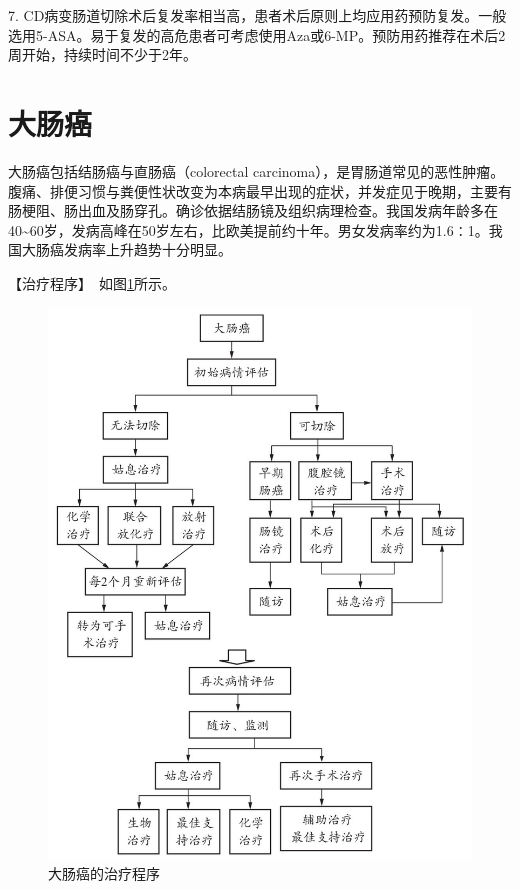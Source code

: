 7.
CD病变肠道切除术后复发率相当高，患者术后原则上均应用药预防复发。一般选用5-ASA。易于复发的高危患者可考虑使用Aza或6-MP。预防用药推荐在术后2周开始，持续时间不少于2年。

\section{大肠癌}

大肠癌包括结肠癌与直肠癌（colorectal
carcinoma），是胃肠道常见的恶性肿瘤。腹痛、排便习惯与粪便性状改变为本病最早出现的症状，并发症见于晚期，主要有肠梗阻、肠出血及肠穿孔。确诊依据结肠镜及组织病理检查。我国发病年龄多在40\textasciitilde{}60岁，发病高峰在50岁左右，比欧美提前约十年。男女发病率约为1.6∶1。我国大肠癌发病率上升趋势十分明显。

【治疗程序】　如图\ref{fig3-7-1}所示。

\begin{figure}[!htbp]
 \centering
 \includegraphics{./images/Image00094.jpg}
 \captionsetup{justification=centering}
 \caption{大肠癌的治疗程序}
 \label{fig3-7-1}
  \end{figure} 

